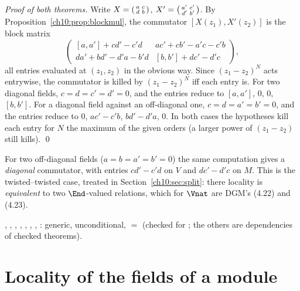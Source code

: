 \emph{Proof of both theorems.}  Write $X=\begin{psmallmatrix}a&c\\d&b\end{psmallmatrix}$,
$X'=\begin{psmallmatrix}a'&c'\\d'&b'\end{psmallmatrix}$.  By
Proposition~\ref{ch10:prop:blockmul}, the commutator $[X(z_1),X'(z_2)]$ is the block matrix
\begin{equation*}
\begin{pmatrix}
 [a,a']+cd'-c'd & ac'+cb'-a'c-c'b\\
 da'+bd'-d'a-b'd & [b,b']+dc'-d'c
\end{pmatrix},
\end{equation*}
all entries evaluated at $(z_1,z_2)$ in the obvious way.  Since $(z_1-z_2)^N$ acts entrywise,
the commutator is killed by $(z_1-z_2)^N$ iff each entry is.  For two diagonal fields,
$c=d=c'=d'=0$, and the entries reduce to $[a,a']$, $0$, $0$, $[b,b']$.  For a diagonal field
against an off-diagonal one, $c=d=a'=b'=0$, and the entries reduce to $0$, $ac'-c'b$,
$bd'-d'a$, $0$.  In both cases the hypotheses kill each entry for $N$ the maximum of the given
orders (a larger power of $(z_1-z_2)$ still kills).  \qed

\begin{remark}\label{ch10:rem:offoff}
For two off-diagonal fields ($a=b=a'=b'=0$) the same computation gives a \emph{diagonal}
commutator, with entries $cd'-c'd$ on $V$ and $dc'-d'c$ on $M$.  This is the twisted--twisted
case, treated in Section~\ref{ch10:sec:split}: there locality is \emph{equivalent} to two
$\End$-valued relations, which for $\Vnat$ are DGM's (4.22) and (4.23).
\end{remark}

\begin{status}
, , , , ,
, , : generic, unconditional,
 $=$  (checked for
; the others are dependencies of checked theorems).
\end{status}

\section{Locality of the fields of a module}\label{ch10:sec:modloc}

